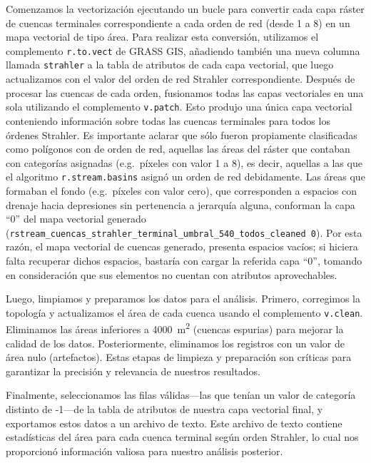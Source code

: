 \documentclass[spanish]{article}
\begin{document}
Comenzamos la vectorización ejecutando un bucle para convertir cada capa
ráster de cuencas terminales correspondiente a cada orden de red (desde
1 a 8) en un mapa vectorial de tipo área. Para realizar esta conversión,
utilizamos el complemento \texttt{r.to.vect} de GRASS GIS, añadiendo
también una nueva columna llamada \texttt{strahler} a la tabla de
atributos de cada capa vectorial, que luego actualizamos con el valor
del orden de red Strahler correspondiente. Después de procesar las
cuencas de cada orden, fusionamos todas las capas vectoriales en una
sola utilizando el complemento \texttt{v.patch}. Esto produjo una única
capa vectorial conteniendo información sobre todas las cuencas
terminales para todos los órdenes Strahler. Es importante aclarar que
sólo fueron propiamente clasificadas como polígonos con de orden de red,
aquellas las áreas del ráster que contaban con categorías asignadas
(e.g.~píxeles con valor 1 a 8), es decir, aquellas a las que el
algoritmo \texttt{r.stream.basins} asignó un orden de red debidamente.
Las áreas que formaban el fondo (e.g.~píxeles con valor cero), que
corresponden a espacios con drenaje hacia depresiones sin pertenencia a
jerarquía alguna, conforman la capa ``0'' del mapa vectorial generado
(\texttt{rstream\_cuencas\_strahler\_terminal\_umbral\_540\_todos\_cleaned\ 0}).
Por esta razón, el mapa vectorial de cuencas generado, presenta espacios
vacíos; si hiciera falta recuperar dichos espacios, bastaría con cargar
la referida capa ``0'', tomando en consideración que sus elementos no
cuentan con atributos aprovechables.

Luego, limpiamos y preparamos los datos para el análisis. Primero,
corregimos la topología y actualizamos el área de cada cuenca usando el
complemento \texttt{v.clean}. Eliminamos las áreas inferiores a
4000~m\textsuperscript{2} (cuencas espurias) para mejorar la calidad de
los datos. Posteriormente, eliminamos los registros con un valor de área
nulo (artefactos). Estas etapas de limpieza y preparación son críticas
para garantizar la precisión y relevancia de nuestros resultados.

Finalmente, seleccionamos las filas válidas---las que tenían un valor de
categoría distinto de -1---de la tabla de atributos de nuestra capa
vectorial final, y exportamos estos datos a un archivo de texto. Este
archivo de texto contiene estadísticas del área para cada cuenca
terminal según orden Strahler, lo cual nos proporcionó información
valiosa para nuestro análisis posterior.
\end{document}
